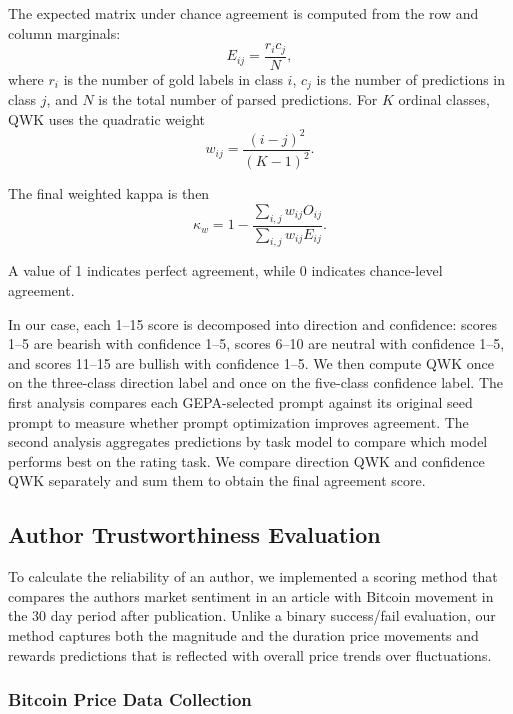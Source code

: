 \documentclass[sigconf,screen]{acmart}
\begin{document}
The expected matrix under chance agreement is computed from the row and column
marginals:
\begin{equation}
E_{ij} = \frac{r_i c_j}{N},
\end{equation}
where $r_i$ is the number of gold labels in class $i$, $c_j$ is the number of
predictions in class $j$, and $N$ is the total number of parsed predictions.
For $K$ ordinal classes, QWK uses the quadratic weight
\begin{equation}
w_{ij} = \frac{(i-j)^2}{(K-1)^2}.
\end{equation}

The final weighted kappa is then
\begin{equation}
\kappa_w =
1 -
\frac{\sum_{i,j} w_{ij}O_{ij}}
     {\sum_{i,j} w_{ij}E_{ij}}.
\end{equation}

A value of 1 indicates perfect agreement, while 0 indicates chance-level
agreement.

In our case, each 1--15 score is decomposed into direction and confidence:
scores 1--5 are bearish with confidence 1--5, scores 6--10 are neutral with
confidence 1--5, and scores 11--15 are bullish with confidence 1--5. We then
compute QWK once on the three-class direction label and once on the five-class
confidence label. The first analysis compares each GEPA-selected prompt
against its original seed prompt to measure whether prompt optimization
improves agreement. The second analysis aggregates predictions by task model
to compare which model performs best on the rating task. We compare direction
QWK and confidence QWK separately and sum them to obtain the final agreement
score.

\subsection{Author Trustworthiness Evaluation}

To calculate the reliability of an author, we implemented a scoring method that compares the authors market sentiment in an article with Bitcoin movement in the 30 day period after publication. Unlike a binary success/fail evaluation, our method captures both the magnitude and the duration price movements and rewards predictions that is reflected with overall price trends over fluctuations.

\subsubsection{Bitcoin Price Data Collection}
\end{document}
